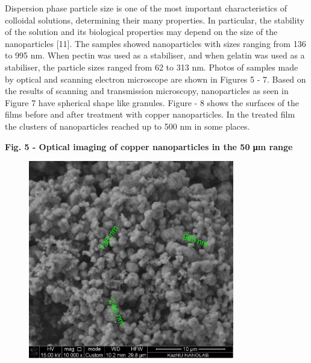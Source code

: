 Dispersion phase particle size is one of the most important
characteristics of colloidal solutions, determining their many
properties. In particular, the stability of the solution and its
biological properties may depend on the size of the nanoparticles
{[}11{]}. The samples showed nanoparticles with sizes ranging from 136
to 995 nm. When pectin was used as a stabiliser, and when gelatin was
used as a stabiliser, the particle sizes ranged from 62 to 313 nm.
Photos of samples made by optical and scanning electron microscope are
shown in Figures 5 - 7. Based on the results of scanning and
transmission microscopy, nanoparticles as seen in Figure 7 have
spherical shape like granules. Figure - 8 shows the surfaces of the
films before and after treatment with copper nanoparticles. In the
treated film the clusters of nanoparticles reached up to 500 nm in some
places.


{\bfseries Fig. 5 - Optical imaging of copper nanoparticles in the 50 μm
range}

\begin{figure}[H]
	\centering
	\includegraphics[width=0.8\textwidth]{assets/19}
	\caption*{}
\end{figure}

